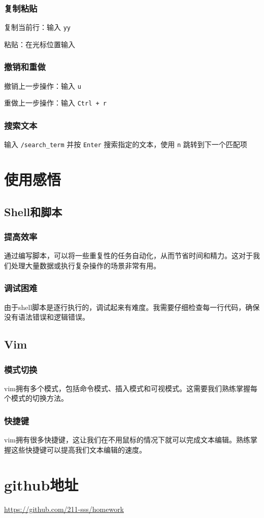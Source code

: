 \documentclass{ctexart}
\begin{document}
\subsubsection{复制粘贴}
复制当前行：输入 \verb|yy|

粘贴：在光标位置输入 
\subsubsection{撤销和重做}
撤销上一步操作：输入 \verb|u| 

重做上一步操作：输入 \verb|Ctrl + r| 
\subsubsection{搜索文本}
输入 \verb|/search_term| 并按 \verb|Enter| 搜索指定的文本，使用 \verb|n| 跳转到下一个匹配项 
\section{使用感悟}
\subsection{Shell和脚本}
\subsubsection{提高效率}
通过编写脚本，可以将一些重复性的任务自动化，从而节省时间和精力。这对于我们处理大量数据或执行复杂操作的场景非常有用。
\subsubsection{调试困难}
由于shell脚本是逐行执行的，调试起来有难度。我需要仔细检查每一行代码，确保没有语法错误和逻辑错误。 
\subsection{Vim}
\subsubsection{模式切换}
vim拥有多个模式，包括命令模式、插入模式和可视模式。这需要我们熟练掌握每个模式的切换方法。
\subsubsection{快捷键}
vim拥有很多快捷键，这让我们在不用鼠标的情况下就可以完成文本编辑。熟练掌握这些快捷键可以提高我们文本编辑的速度。
\section{github地址}
\url{https://github.com/211-sss/homework}
\end{document}
